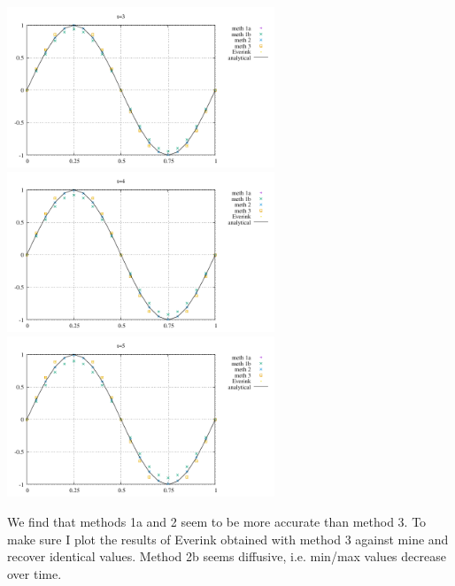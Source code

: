 \begin{center}
\includegraphics[width=8cm]{python_codes/fieldstone_164/results1/u_5.pdf}\\
\includegraphics[width=8cm]{python_codes/fieldstone_164/results1/u_6.pdf}
\includegraphics[width=8cm]{python_codes/fieldstone_164/results1/u_7.pdf}
\end{center}
We find that methods 1a and 2 seem to be more accurate than method 3.
To make sure I plot the results of Everink obtained with method 3 against mine 
and recover identical values.
Method 2b seems diffusive, i.e. min/max values decrease over time.

